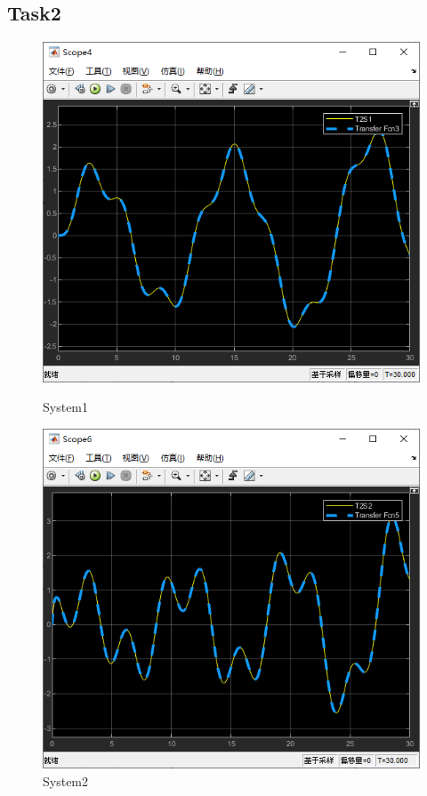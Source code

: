 \documentclass[12pt,a4paper,oneside]{ctexart}
\begin{document}
    \subsection{Task2}
    \begin{figure}[H]
        \centering
        \includegraphics[width = 0.6\linewidth]{../screenshots/MT2S1ResultLT.PNG}
        \caption{System1}
        \includegraphics[width = 0.6\linewidth]{../screenshots/MT2S2ResultLT.PNG}
        \caption{System2}
    \end{figure}
\end{document}
